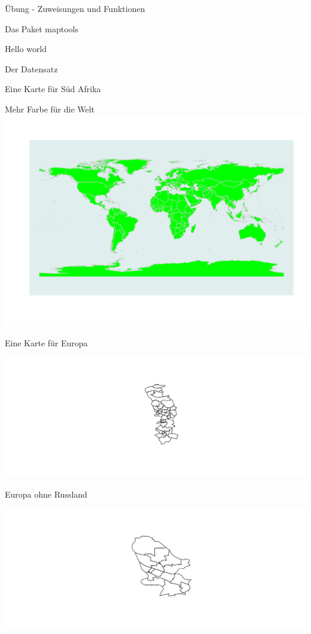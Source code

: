\documentclass[ignorenonframetext,]{beamer}
\begin{document}
\begin{frame}[fragile]{Übung - Zuweisungen und Funktionen}
\begin{frame}[fragile]{Das Paket maptools}
\begin{frame}[fragile]{Hello world}
\begin{frame}[fragile]{Der Datensatz}
\begin{frame}[fragile]{Eine Karte für Süd Afrika}
\begin{frame}{Mehr Farbe für die Welt}
\includegraphics{Geomedizin_files/figure-beamer/unnamed-chunk-95-1.pdf}

\end{frame}

\begin{frame}{Eine Karte für Europa}

\includegraphics{Geomedizin_files/figure-beamer/unnamed-chunk-96-1.pdf}

\end{frame}

\begin{frame}{Europa ohne Russland}

\includegraphics{Geomedizin_files/figure-beamer/unnamed-chunk-97-1.pdf}


\end{frame}
\end{frame}
\end{frame}
\end{frame}
\end{frame}
\end{frame}
\end{document}
